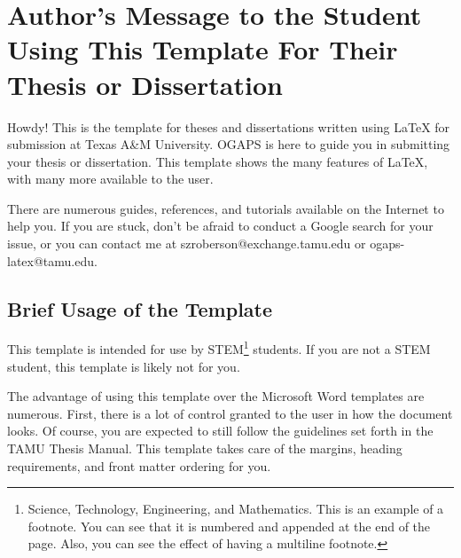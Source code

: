 %
%
%



\section{Author's Message to the Student Using This Template For Their Thesis or Dissertation}

Howdy! This is the template for theses and dissertations written using \LaTeX{} for submission at Texas A\&M University. \ac{OGAPS} is here to guide you in submitting your thesis or dissertation. This template shows the many features of \LaTeX{}, with many more available to the user.

There are numerous guides, references, and tutorials available on the Internet to help you. If you are stuck, don't be afraid to conduct a Google search for your issue, or you can contact me at szroberson@exchange.tamu.edu or ogaps-latex@tamu.edu.


\subsection{Brief Usage of the Template}

This template is intended for use by STEM\footnote{Science, Technology, Engineering, and Mathematics. This is an example of a footnote. You can see that it is numbered and appended at the end of the page. Also, you can see the effect of having a multiline footnote.} students. If you are not a STEM student, this template is likely not for you.

The advantage of using this template over the Microsoft Word templates are numerous. First, there is a lot of control granted to the user in how the document looks. Of course, you are expected to still follow the guidelines set forth in the TAMU Thesis Manual. This template takes care of the margins, heading requirements, and front matter ordering for you.


